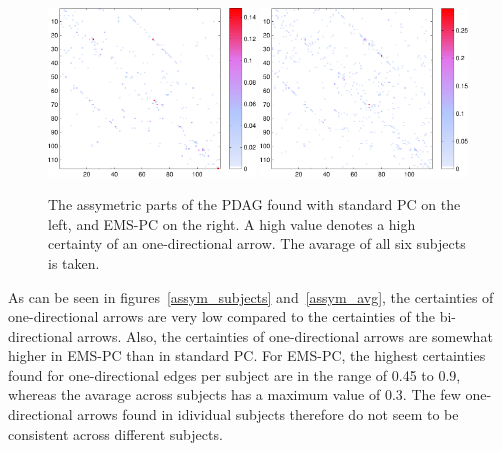\documentclass[a4paper, 10pt, english, onecolumn]{article}
\begin{document}
\begin{figure}[h!]
  \centering
  \includegraphics[width=0.49\textwidth]{images/new/assym_avg_mod-crop}
  \includegraphics[width=0.49\textwidth]{images/new/assym_avg_expl-crop}
  \caption{The assymetric parts of the PDAG found with standard PC on the left, and EMS-PC on the right. A high value denotes a high certainty of an one-directional arrow. The avarage of all six subjects is taken.}
  \label{fig:assym_avg}
\end{figure}

As can be seen in figures~\ref{assym_subjects} and~\ref{assym_avg}, the certainties of one-directional arrows are very low compared to the certainties of the bi-directional arrows. Also, the certainties of one-directional arrows are somewhat higher in EMS-PC than in standard PC.
For EMS-PC, the highest certainties found for one-directional edges per subject are in the range of 0.45 to 0.9, whereas the avarage across subjects has a maximum value of 0.3.
The few one-directional arrows found in idividual subjects therefore do not seem to be consistent across different subjects.
\end{document}

